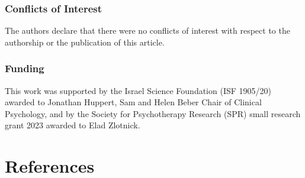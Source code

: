 \documentclass[
  man,floatsintext]{apa7}
\begin{document}
\subsubsection{Conflicts of Interest}\label{conflicts-of-interest}

The authors declare that there were no conflicts of interest with respect to the authorship or the publication of this article.

\subsubsection{Funding}\label{funding}

This work was supported by the Israel Science Foundation (ISF 1905/20) awarded to Jonathan Huppert, Sam and Helen Beber Chair of Clinical Psychology, and by the Society for Psychotherapy Research (SPR) small research grant 2023 awarded to Elad Zlotnick.

\newpage

\section{References}\label{references}
\end{document}
